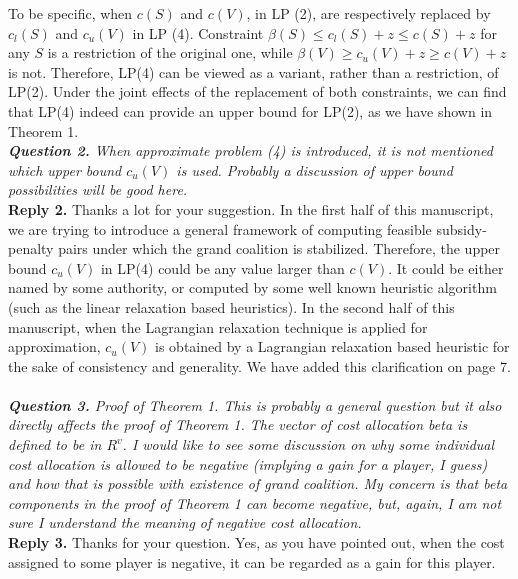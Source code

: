 \documentclass[11pt]{article}
\begin{document}
To be specific, when $c(S)$ and $c(V)$, in LP (2), are respectively replaced by $c_l(S)$ and $c_u(V)$ in LP (4).
Constraint $\beta(S) \leq c_l(S) + z \leq c(S) + z$ for any $S$ is a restriction of the original one, while $\beta(V) \geq c_u(V) + z \geq c(V) + z$ is not.
Therefore, LP(4) can be viewed as a variant, rather than a restriction, of LP(2).
Under the joint effects of the replacement of both constraints, we can find that LP(4) indeed can provide an upper bound for LP(2), as we have shown in Theorem 1.
\\[4mm]
%
%
%
\noindent \textit{\textbf{Question 2.}
When approximate problem (4) is introduced, it is not mentioned which upper bound $c_u(V)$ is used. Probably a discussion of upper bound possibilities will be good here.}
\\[2mm]
\noindent \textbf{Reply 2.}
Thanks a lot for your suggestion.
In the first half of this manuscript, we are trying to introduce a general framework of computing feasible subsidy-penalty pairs under which the grand coalition is stabilized.
Therefore, the upper bound $c_u(V)$ in LP(4) could be any value larger than $c(V)$.
It could be either named by some authority, or computed by some well known heuristic algorithm (such as the linear relaxation based heuristics).
In the second half of this manuscript, when the Lagrangian relaxation technique is applied for approximation, $c_u(V)$ is obtained by a Lagrangian relaxation based heuristic for the sake of consistency and generality. We have added this clarification on page 7.
~\\[4mm]
%
%
%
\noindent \textit{\textbf{Question 3.}
Proof of Theorem 1. This is probably a general question but it also directly affects the proof of Theorem 1. The vector of cost allocation beta is defined to be in $R^v$.
I would like to see some discussion on why some individual cost allocation is allowed to be negative (implying a gain for a player, I guess) and how that is possible with existence of grand coalition. My concern is that beta components in the proof of Theorem 1 can become negative, but, again, I am not sure I understand the meaning of negative cost allocation.}
\\[2mm]
\noindent \textbf{Reply 3.}
Thanks for your question.
Yes, as you have pointed out, when the cost assigned to some player is negative, it can be regarded as a gain for this player.
\end{document}
